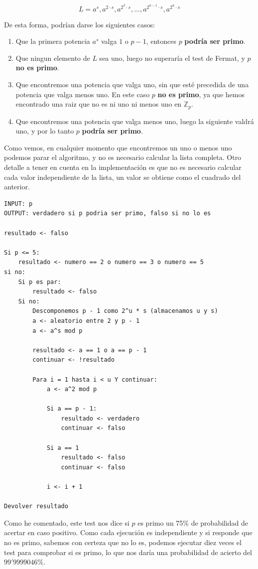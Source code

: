 \documentclass[12pt, spanish]{article}
\begin{document}
$$L = {a^s, a^{2 \cdot s}, a^{2^2 \cdot s}, ..., a^{2^{u - 1} \cdot s}, a^{2^{u} \cdot s}}$$

De esta forma, podrían darse los siguientes casos:

\begin{enumerate}
	\item Que la primera potencia $a^s$ valga $1$ o $p - 1$, entonces $p$ \textbf{podría ser primo}.
	\item Que ningun elemento de $L$ sea uno, luego no superaría el test de Fermat, y $p$ \textbf{no es primo}.
	\item Que encontremos una potencia que valga uno, sin que esté precedida de una potencia que valga menos uno. En este caso $p$ \textbf{no es primo}, ya que hemos encontrado una raiz que no es ni uno ni menos uno en $\mathbb{Z}_p$.
	\item Que encontremos una potencia que valga menos uno, luego la siguiente valdrá uno, y por lo tanto $p$ \textbf{podría ser primo}.
\end{enumerate}

Como vemos, en cualquier momento que encontremos un uno o menos uno podemos parar el algoritmo, y no es necesario calcular la lista completa. Otro detalle a tener en cuenta en la implementación es que no es necesario calcular cada valor independiente de la lista, un valor se obtiene como el cuadrado del anterior.

\begin{lstlisting}[caption={Test de Miller-Rabin}]
INPUT: p
OUTPUT: verdadero si p podria ser primo, falso si no lo es

resultado <- falso

Si p <= 5:
	resultado <- numero == 2 o numero == 3 o numero == 5
si no:
	Si p es par:
		resultado <- falso
	Si no:
		Descomponemos p - 1 como 2^u * s (almacenamos u y s)
		a <- aleatorio entre 2 y p - 1
		a <- a^s mod p

		resultado <- a == 1 o a == p - 1
		continuar <- !resultado

		Para i = 1 hasta i < u Y continuar:
			a <- a^2 mod p

			Si a == p - 1:
				resultado <- verdadero
				continuar <- falso

			Si a == 1
				resultado <- falso
				continuar <- falso

			i <- i + 1

Devolver resultado
\end{lstlisting}

Como he comentado, este test nos dice si $p$ es primo un 75\% de probabilidad de acertar en caso positivo. Como cada ejecución es independiente y si responde que no es primo, sabemos con certeza que no lo es, podemos ejecutar diez veces el test para comprobar si es primo, lo que nos daría una probabilidad de acierto del $99'9999046\%$.
\end{document}
